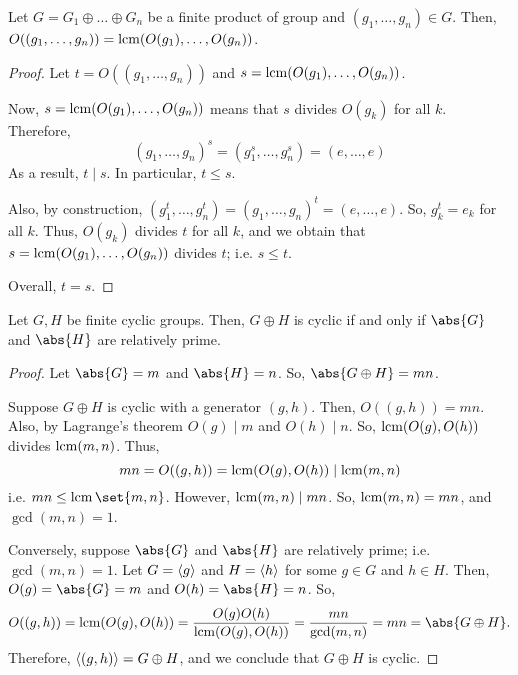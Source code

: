 \documentclass[11pt]{penrose}
\begin{document}
\begin{nthm}
    Let $G = G_{1} \oplus \dots \oplus G_{n}$ be a finite product of group and $(g_{1}, \dots, g_{n}) \in G$. Then, $O( (g_{1}, \dots, g_{n}) ) = \operatorname{lcm}( O(g_{1}), \dots, O(g_{n}) )$.
\end{nthm}
\begin{proof}
    Let $t = O( (g_{1}, \dots, g_{n}) )$ and $s = \operatorname{lcm}( O(g_{1}), \dots, O(g_{n}) )$.

    Now, $s = \operatorname{lcm}( O(g_{1}), \dots, O(g_{n}) )$ means that $s$ divides $O(g_{k})$ for all $k$. Therefore,
    \begin{equation*}
        (g_{1}, \dots, g_{n})^{s} = (g_{1}^{s}, \dots, g_{n}^{s}) = (e, \dots, e)
    \end{equation*}
    As a result, $t \mid s$. In particular, $t \leq s$.

    Also, by construction, $(g_{1}^{t}, \dots, g_{n}^{t}) = (g_{1}, \dots, g_{n})^{t} = (e, \dots, e)$. So, $g_{k}^{t} = e_{k}$ for all $k$. Thus, $O(g_{k})$ divides $t$ for all $k$, and we obtain that $s = \operatorname{lcm}( O(g_{1}), \dots, O(g_{n}) )$ divides $t$; i.e. $s \leq t$.

    Overall, $t = s$.
\end{proof}

\begin{nthm}
    Let $G, H$ be finite cyclic groups. Then, $G \oplus H$ is cyclic if and only if $\abs{G}$ and $\abs{H}$ are relatively prime.
\end{nthm}
\begin{proof}
    Let $\abs{G} = m$ and $\abs{H} = n$. So, $\abs{G \oplus H} = mn$.

    Suppose $G \oplus H$ is cyclic with a generator $(g,h)$. Then, $O((g,h)) = mn$. Also, by Lagrange's theorem $O(g) \mid m$ and $O(h) \mid n$. So, $\operatorname{lcm}(O(g), O(h))$ divides $\operatorname{lcm}(m,n)$. Thus,
    \begin{equation*}
        mn = O((g,h)) = \operatorname{lcm}(O(g), O(h)) \mid \operatorname{lcm}(m,n)
    \end{equation*}
    i.e. $mn \leq \lcm\set{m,n}$. However, $\operatorname{lcm}(m,n) \mid mn$. So, $\operatorname{lcm}(m,n) = mn$, and $\gcd(m,n) = 1$.

    Conversely, suppose $\abs{G}$ and $\abs{H}$ are relatively prime; i.e. $\gcd(m,n) = 1$. Let $G = \langle g\rangle$ and $H = \langle h\rangle$ for some $g \in G$ and $h \in H$. Then, $O(g) = \abs{G} = m$ and $O(h) = \abs{H} = n$. So,
    \begin{equation*}
        O( (g,h) )
        = \lcm(O(g), O(h))
        = \frac{O(g)O(h)}{\lcm(O(g), O(h))}
        = \frac{mn}{\gcd(m,n)}
        = mn
        = \abs{G \oplus H}.
    \end{equation*}
    Therefore, $\langle(g,h)\rangle = G \oplus H$, and we conclude that $G \oplus H$ is cyclic.
\end{proof}
\end{document}
